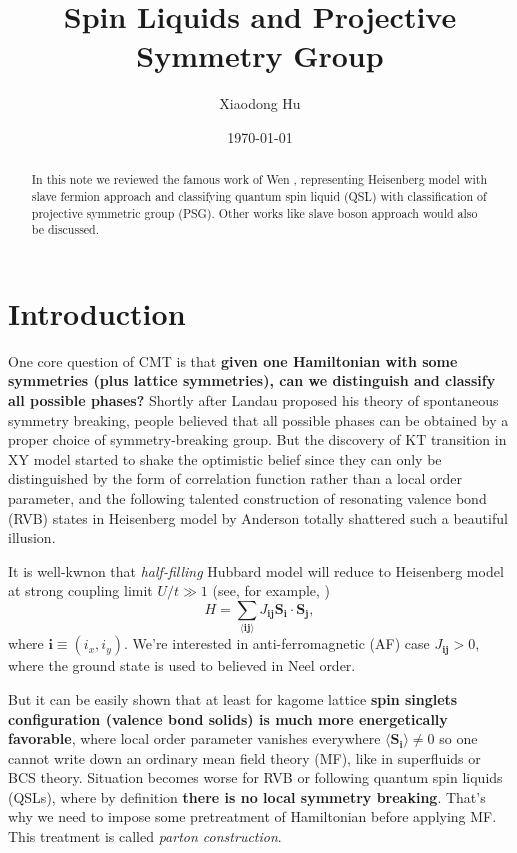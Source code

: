 \documentclass[10pt,nofootinbib]{revtex4}
\begin{document}
\title{Spin Liquids and Projective Symmetry Group}%

\author{Xiaodong Hu}

\date{\today}


\begin{abstract}
	In this note we reviewed the famous work of Wen \cite{wen1991mean,wen2002quantum}, representing Heisenberg model with slave fermion approach and classifying quantum spin liquid (QSL) with classification of projective symmetric group (PSG). Other works like slave boson approach would also be discussed.
\end{abstract}
\maketitle
\tableofcontents

\section{Introduction}
	One core question of CMT is that \textbf{given one Hamiltonian with some symmetries (plus lattice symmetries), can we distinguish and classify all possible phases?} Shortly after Landau proposed his theory of spontaneous symmetry breaking, people believed that all possible phases can be obtained by a proper choice of symmetry-breaking group. But the discovery of KT transition in XY model started to shake the optimistic belief since they can only be distinguished by the form of correlation function rather than a local order parameter, and the following talented construction of resonating valence bond (RVB) states in Heisenberg model by Anderson \cite{anderson1973resonating,anderson1987resonating} totally shattered such a beautiful illusion.\par

	It is well-kwnon that \emph{half-filling} Hubbard model will reduce to Heisenberg model at strong coupling limit $U/t\gg1$ (see, for example, \cite{emery1976theory,Fradkin2013Field})
	\begin{equation}\label{0.1.1}
		H=\sum_{\langle \bm{ij}\rangle}J_{\bm{ij}}\bm{S}_{\bm{i}}\cdot\bm{S}_{\bm{j}},
	\end{equation}
	where $\bm{i}\equiv(i_x,i_y)$. We're interested in anti-ferromagnetic (AF) case $J_{\bm{ij}}>0$, where the ground state is used to believed in Neel order.\par
	But it can be easily shown that at least for kagome lattice \textbf{spin singlets configuration (valence bond solids) is much more energetically favorable}, where local order parameter vanishes everywhere $\langle \bm{S}_{\bm{i}}\rangle\neq0$ so one cannot write down an ordinary mean field theory (MF), like in superfluids or BCS theory. Situation becomes worse for RVB or following quantum spin liquids (QSLs), where by definition \textbf{there is no local symmetry breaking}. That's why we need to impose some pretreatment of Hamiltonian before applying MF. This treatment is called \emph{parton construction}.
\end{document}

